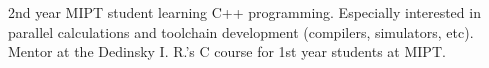 \documentclass[9pt]{developercv} %
\begin{document}
\vspace{0.5cm}



\begin{minipage}[t]{0.4\textwidth} %
        \vspace{-\baselineskip} %
        2nd year MIPT student learning C++ programming. Especially interested in parallel calculations
        and toolchain development (compilers, simulators, etc). Mentor at the Dedinsky I. R.'s
        C course for 1st year students at MIPT.

\end{minipage}
\hfill %
\begin{minipage}[t]{0.5\textwidth} %
        \vspace{-\baselineskip} %
        \begin{barchart}{5.5}
        \end{barchart}
\end{minipage}



\end{document}
